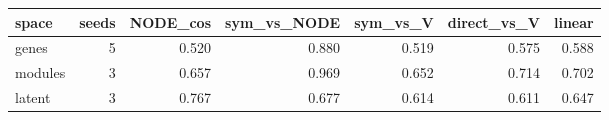 \begin{tabular}{lrrrrrr}
\hline
space & seeds & NODE\_cos & sym\_vs\_NODE & sym\_vs\_V & direct\_vs\_V & linear \\
\hline
genes & 5 & 0.520 & 0.880 & 0.519 & 0.575 & 0.588 \\
modules & 3 & 0.657 & 0.969 & 0.652 & 0.714 & 0.702 \\
latent & 3 & 0.767 & 0.677 & 0.614 & 0.611 & 0.647 \\
\hline
\end{tabular}
